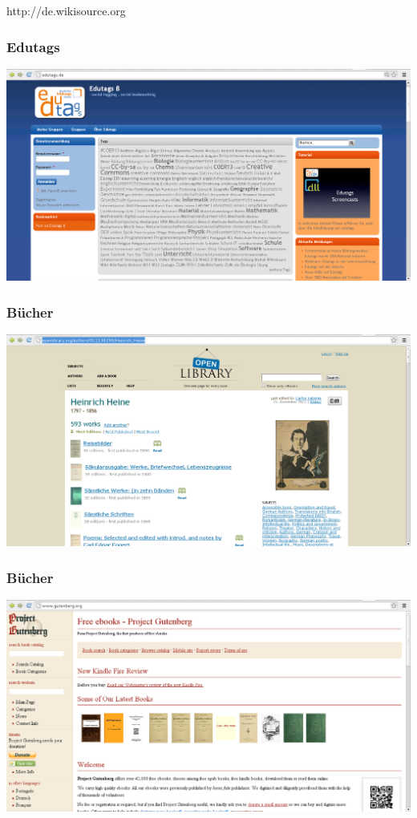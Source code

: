 \documentclass[table]{beamer}
\begin{document}
\begin{frame}
    \begin{center}\Large
      http://de.wikisource.org
    \end {center}
\end{frame}

\begin{frame}
  \frametitle{Edutags}
  \includegraphics[width=\textwidth]{img/edutags.png}
\end{frame}

\begin{frame}
  \frametitle{Bücher}
  \includegraphics[width=\textwidth]{img/openlibrary.png}
\end{frame}

\begin{frame}
  \frametitle{Bücher}
  \includegraphics[width=\textwidth]{img/gutenberg.png}
\end{frame}
\end{document}
